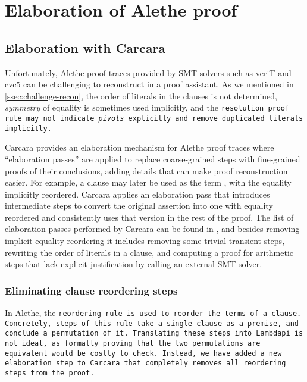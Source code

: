 \chapter{Elaboration of Alethe proof}\label{ch:elab}

\section{Elaboration with Carcara}
\label{sect:elaboration}

Unfortunately, Alethe proof traces provided by SMT solvers such as veriT and cvc5 can be challenging to reconstruct in a proof assistant.
As we mentioned in \cref{ssec:challenge-recon}, the order of literals in the clauses is not determined, \emph{symmetry}
of equality is sometimes used implicitly, and the \tt{resolution} proof rule may not indicate \emph{pivots} explicitly and remove duplicated literals implicitly.

Carcara provides an elaboration mechanism \cite[\S 3]{carcara} for Alethe proof traces where ``elaboration passes'' are applied to replace coarse-grained steps with
fine-grained proofs of their conclusions, adding details that can make proof reconstruction easier.
%
For example, a clause  may later be used as the term , with the equality  implicitly reordered.
%
Carcara applies an elaboration pass that introduces intermediate steps to convert the original assertion into one with equality reordered and consistently uses that version in the rest of the proof.
%
The list of elaboration passes performed by Carcara can be found in \cite[\S
3.2]{carcara}, and besides removing implicit equality reordering it includes
removing some trivial transient steps, rewriting the order of literals in a
clause, and computing a proof for arithmetic steps that lack explicit justification by calling an
external SMT solver.

\subsection{Eliminating clause reordering steps}
\label{ssec:elabration-reordering}

In Alethe, the \tt{reordering} rule is used to reorder the terms of a clause. Concretely, steps of this rule take a single clause as a premise, and conclude a permutation of it.
Translating these steps into Lambdapi is not ideal, as formally proving that the two permutations are equivalent would be costly to check.
Instead, we have added a new elaboration step to Carcara that completely removes all \tt{reordering} steps from the proof.


